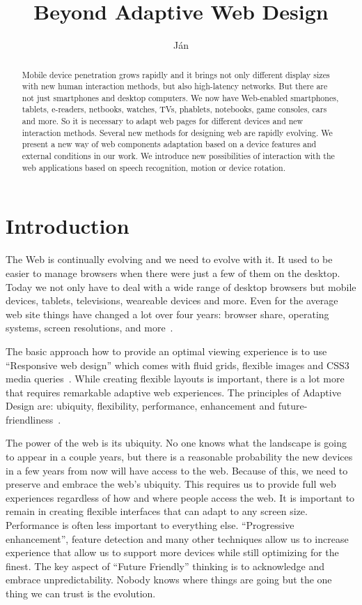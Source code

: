 \documentclass{iitsrc}
\title{Beyond Adaptive Web Design}
\author{Ján}{Antala}
\begin{document}
\begin{abstract}
Mobile device penetration grows rapidly and it brings not only different display sizes with new human interaction methods, but also high-latency networks. But there are not just smartphones and desktop computers. We now have Web-enabled smartphones, tablets, e-readers, netbooks, watches, TVs, phablets, notebooks, game consoles, cars and more. So it is necessary to adapt web pages for different devices and new interaction methods. Several new methods for designing web are rapidly evolving. We present a new way of web components adaptation based on a device features and external conditions in our work. We introduce new possibilities of interaction with the web applications based on speech recognition, motion or device rotation.
\end{abstract}

\section{Introduction}

The Web is continually evolving and we need to evolve with it. It used to be easier to manage browsers when there were just a few of them on the desktop. Today we not only have to deal with a wide range of desktop browsers but mobile devices, tablets, televisions, weareable devices and more. Even for the average web site things have changed a lot over four years: browser share, operating systems, screen resolutions, and more~\cite{ui17}.

The basic approach how to provide an optimal viewing experience is to use ``Responsive web design'' which comes with fluid grids, flexible images and CSS3 media queries~\cite{responsive}. While creating flexible layouts is important, there is a lot more that requires remarkable adaptive web experiences. The principles of Adaptive Design are: ubiquity, flexibility, performance, enhancement and future-friendliness~\cite{adaptivesxsw}.

The power of the web is its ubiquity. No one knows what the landscape is going to appear in a couple years, but there is a reasonable probability the new devices in a few years from now will have access to the web. Because of this, we need to preserve and embrace the web's ubiquity. This requires us to provide full web experiences regardless of how and where people access the web. It is important to remain in creating flexible interfaces that can adapt to any screen size. Performance is often less important to everything else. ``Progressive enhancement'', feature detection and many other techniques allow us to increase experience that allow us to support more devices while still optimizing for the finest. The key aspect of ``Future Friendly'' thinking is to acknowledge and embrace unpredictability. Nobody knows where things are going but the one thing we can trust is the evolution.
\end{document}
